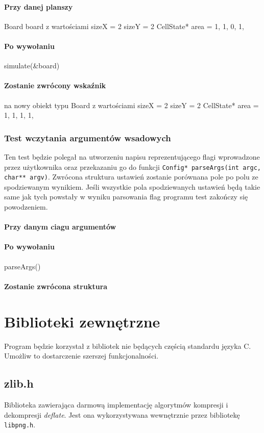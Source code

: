 \documentclass{article}
\begin{document}
\paragraph{Przy danej planszy} Board board z wartościami sizeX = 2 sizeY = 2 CellState* area = {1, 1, 0, 1,}
\paragraph{Po wywołaniu} simulate(\&board)
\paragraph{Zostanie zwrócony wskaźnik} na nowy obiekt typu Board z wartościami sizeX = 2 sizeY = 2 CellState* area = {1, 1, 1, 1,}

\subsubsection{Test wczytania argumentów wsadowych}
Ten test będzie polegał na utworzeniu napisu reprezentującego flagi wprowadzone przez użytkownika oraz przekazaniu go do funkcji \texttt{Config* parseArgs(int argc, char** argv)}. Zwrócona struktura ustawień zostanie porównana pole po polu ze spodziewanym wynikiem. Jeśli wszystkie pola spodziewanych ustawień będą takie same jak tych powstały w wyniku parsowania flag programu test zakończy się powodzeniem.

\paragraph{Przy danym ciagu argumentów} 
\paragraph{Po wywołaniu} parseArgs()
\paragraph{Zostanie zwrócona struktura} 

\section{Biblioteki zewnętrzne}
Program będzie korzystał z bibliotek nie będących częścią standardu języka C. Umożliw to dostarczenie szerszej funkcjonalności.

\subsection{zlib.h}
Biblioteka zawierająca darmową implementację algorytmów kompresji i dekompresji \textit{deflate}. Jest ona wykorzystywana wewnętrznie przez bibliotekę \texttt{libpng.h}.
\end{document}
